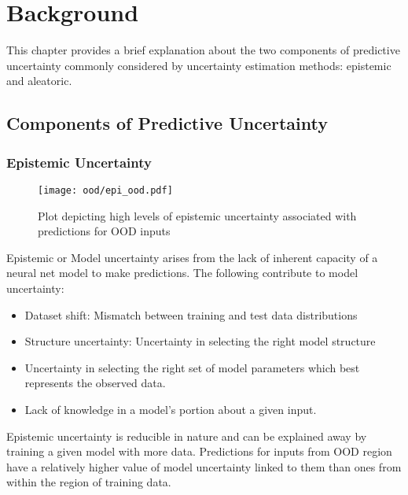

    \chapter{Background}
	This chapter provides a brief explanation about the two components of predictive uncertainty commonly considered by uncertainty estimation methods: epistemic and aleatoric.
	\section{Components of Predictive Uncertainty} 
	\subsection{Epistemic Uncertainty}
		\begin{figure}[H]
		\centering
		\texttt{[image: ood/epi\_ood.pdf]}
		\caption{Plot depicting high levels of epistemic uncertainty associated with predictions for OOD inputs}
		\label{fig_epi_ood}
		\end{figure}
	Epistemic or Model uncertainty arises from  the lack of inherent capacity of a neural net model to make predictions. The following contribute to model uncertainty:
	\begin{itemize}
		\item Dataset shift: Mismatch between training and test data distributions
		\item Structure uncertainty: Uncertainty in selecting the right model structure
		\item Uncertainty in selecting the right set of model parameters which best represents the observed data.
		\item Lack of knowledge in a model's portion about a given input.
	\end{itemize}
	Epistemic uncertainty is reducible in nature and can be explained away by training a given model with more data. Predictions for inputs from OOD region have a relatively higher value of model uncertainty linked to them than ones from within the region of training data. 

